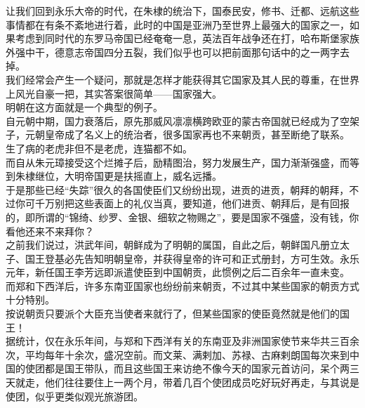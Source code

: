 	\begin{multicols}{\theparacolNo}
\fi
让我们回到永乐大帝的时代，在朱棣的统治下，国泰民安，修书、迁都、远航这些事情都在有条不紊地进行着，此时的中国是亚洲乃至世界上最强大的国家之一，如果考虑到同时代的东罗马帝国已经奄奄一息，英法百年战争还在打，哈布斯堡家族外强中干，德意志帝国四分五裂，我们似乎也可以把前面那句话中的之一两字去掉。\\

我们经常会产生一个疑问，那就是怎样才能获得其它国家及其人民的尊重，在世界上风光自豪一把，其实答案很简单——国家强大。\\

明朝在这方面就是一个典型的例子。\\

自元朝中期，国力衰落后，原先那威风凛凛横跨欧亚的蒙古帝国就已经成为了空架子，元朝皇帝成了名义上的统治者，很多国家再也不来朝贡，甚至断绝了联系。\\

生了病的老虎非但不是老虎，连猫都不如。\\

而自从朱元璋接受这个烂摊子后，励精图治，努力发展生产，国力渐渐强盛，而等到朱棣继位，大明帝国更是扶摇直上，威名远播。\\

于是那些已经“失踪”很久的各国使臣们又纷纷出现，进贡的进贡，朝拜的朝拜，不过你可千万别把这些表面上的礼仪当真，要知道，他们进贡、朝拜后，是有回报的，即所谓的“锦绮、纱罗、金银、细软之物赐之”，要是国家不强盛，没有钱，你看他还来不来拜你？\\

之前我们说过，洪武年间，朝鲜成为了明朝的属国，自此之后，朝鲜国凡册立太子、国王登基必先告知明朝皇帝，并获得皇帝的许可和正式册封，方可生效。永乐元年，新任国王李芳远即派遣使臣到中国朝贡，此惯例之后二百余年一直未变。\\

而郑和下西洋后，许多东南亚国家也纷纷前来朝贡，不过其中某些国家的朝贡方式十分特别。\\

按说朝贡只要派个大臣充当使者来就行了，但某些国家的使臣竟然就是他们的国王！\\

据统计，仅在永乐年间，与郑和下西洋有关的东南亚及非洲国家使节来华共三百余次，平均每年十余次，盛况空前。而文莱、满剌加、苏禄、古麻剌朗国每次来到中国的使团都是国王带队，而且这些国王来访绝不像今天的国家元首访问，呆个两三天就走，他们往往要住上一两个月，带着几百个使团成员吃好玩好再走，与其说是使团，似乎更类似观光旅游团。\\


\end{multicols}
